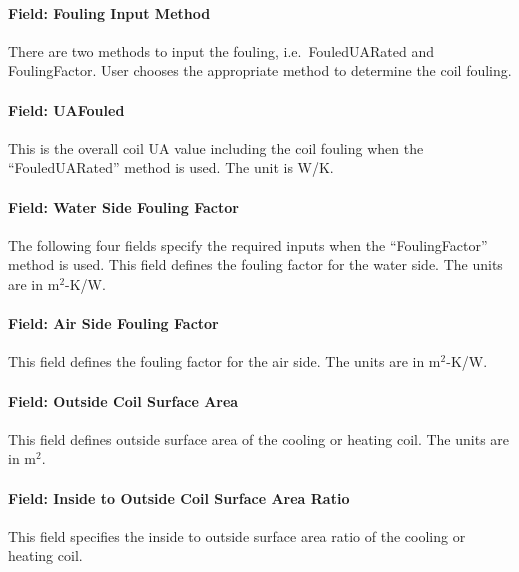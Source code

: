 \paragraph{Field: Fouling Input Method}\label{field-fouling-input-method}

There are two methods to input the fouling, i.e.~FouledUARated and FoulingFactor. User chooses the appropriate method to determine the coil fouling.

\paragraph{Field: UAFouled}\label{field-uafouled}

This is the overall coil UA value including the coil fouling when the ``FouledUARated'' method is used. The unit is W/K.

\paragraph{Field: Water Side Fouling Factor}\label{field-water-side-fouling-factor}

The following four fields specify the required inputs when the ``FoulingFactor'' method is used. This field defines the fouling factor for the water side. The units are in m\(^{2}\)-K/W.

\paragraph{Field: Air Side Fouling Factor}\label{field-air-side-fouling-factor}

This field defines the fouling factor for the air side. The units are in m\(^{2}\)-K/W.

\paragraph{Field: Outside Coil Surface Area}\label{field-outside-coil-surface-area}

This field defines outside surface area of the cooling or heating coil. The units are in m\(^{2}\).

\paragraph{Field: Inside to Outside Coil Surface Area Ratio}\label{field-inside-to-outside-coil-surface-area-ratio}

This field specifies the inside to outside surface area ratio of the cooling or heating coil.

